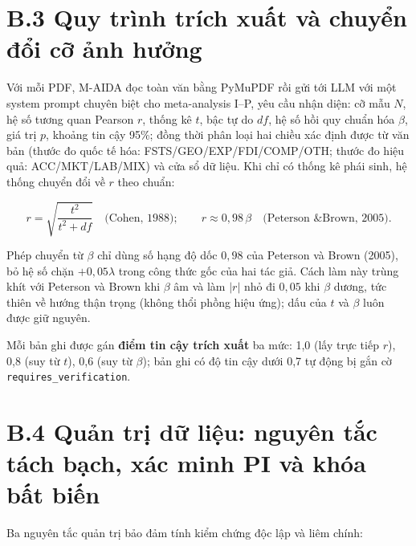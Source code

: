 \documentclass[
  a4paper,
  13pt]{extreport}
\begin{document}
\hypertarget{b.3-quy-truxecnh-truxedch-xuux1ea5t-vuxe0-chuyux1ec3n-ux111ux1ed5i-cux1ee1-ux1ea3nh-hux1b0ux1edfng}{%
\section{B.3 Quy trình trích xuất và chuyển đổi cỡ ảnh
hưởng}\label{b.3-quy-truxecnh-truxedch-xuux1ea5t-vuxe0-chuyux1ec3n-ux111ux1ed5i-cux1ee1-ux1ea3nh-hux1b0ux1edfng}}

Với mỗi PDF, M-AIDA đọc toàn văn bằng PyMuPDF rồi gửi tới LLM với một
system prompt chuyên biệt cho meta-analysis I--P, yêu cầu nhận diện: cỡ
mẫu \(N\), hệ số tương quan Pearson \(r\), thống kê \(t\), bậc tự do
\(df\), hệ số hồi quy chuẩn hóa \(\beta\), giá trị \(p\), khoảng tin cậy
95\%; đồng thời phân loại hai chiều xác định được từ văn bản (thước đo
quốc tế hóa: FSTS/GEO/EXP/FDI/COMP/OTH; thước đo hiệu quả:
ACC/MKT/LAB/MIX) và cửa sổ dữ liệu. Khi chỉ có thống kê phái sinh, hệ
thống chuyển đổi về \(r\) theo chuẩn:

\[ r = \sqrt{\dfrac{t^2}{t^2 + df}} \quad \text{(Cohen, 1988)}; \qquad r \approx 0{,}98\,\beta \quad \text{(Peterson \& Brown, 2005)}. \]

Phép chuyển từ \(\beta\) chỉ dùng số hạng độ dốc \(0{,}98\) của Peterson
và Brown (2005), bỏ hệ số chặn \(+0{,}05\lambda\) trong công thức gốc
của hai tác giả. Cách làm này trùng khít với Peterson và Brown khi
\(\beta\) âm và làm \(|r|\) nhỏ đi \(0{,}05\) khi \(\beta\) dương, tức
thiên về hướng thận trọng (không thổi phồng hiệu ứng); dấu của \(t\) và
\(\beta\) luôn được giữ nguyên.

Mỗi bản ghi được gán \textbf{điểm tin cậy trích xuất} ba mức: 1,0 (lấy
trực tiếp \(r\)), 0,8 (suy từ \(t\)), 0,6 (suy từ \(\beta\)); bản ghi có
độ tin cậy dưới 0,7 tự động bị gắn cờ \texttt{requires\_verification}.

\hypertarget{b.4-quux1ea3n-trux1ecb-dux1eef-liux1ec7u-nguyuxean-tux1eafc-tuxe1ch-bux1ea1ch-xuxe1c-minh-pi-vuxe0-khuxf3a-bux1ea5t-biux1ebfn}{%
\section{B.4 Quản trị dữ liệu: nguyên tắc tách bạch, xác minh PI và khóa
bất
biến}\label{b.4-quux1ea3n-trux1ecb-dux1eef-liux1ec7u-nguyuxean-tux1eafc-tuxe1ch-bux1ea1ch-xuxe1c-minh-pi-vuxe0-khuxf3a-bux1ea5t-biux1ebfn}}

Ba nguyên tắc quản trị bảo đảm tính kiểm chứng độc lập và liêm chính:
\end{document}
